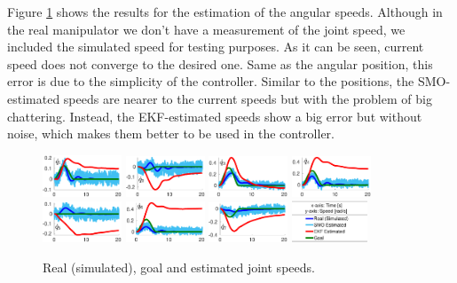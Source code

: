 \documentclass[conference,letterpaper]{ieeeconf}
\begin{document}
Figure \ref{fig:result_qp} shows the results for the estimation of the angular speeds. Although in the real manipulator we don't have a measurement of the joint speed, we included the simulated speed for testing purposes. As it can be seen, current speed does not converge to the desired one. Same as the angular position, this error is due to the simplicity of the controller. Similar to the positions, the SMO-estimated speeds are nearer to the current speeds but with the problem of big chattering. Instead, the EKF-estimated speeds show a big error but without noise, which makes them better to be used in the controller. 
\begin{figure}
  \centering
  \includegraphics[width=0.21\textwidth]{Figures/result_qp1.eps}
  \includegraphics[width=0.21\textwidth]{Figures/result_qp2.eps}
  \includegraphics[width=0.21\textwidth]{Figures/result_qp3.eps}
  \includegraphics[width=0.21\textwidth]{Figures/result_qp4.eps}
  \includegraphics[width=0.21\textwidth]{Figures/result_qp5.eps}
  \includegraphics[width=0.21\textwidth]{Figures/result_qp6.eps}
  \includegraphics[width=0.21\textwidth]{Figures/result_qp7.eps}
  \includegraphics[width=0.2\textwidth]{Figures/result_qp_legend.eps}
  \caption{Real (simulated), goal and estimated joint speeds.}
  \label{fig:result_qp}
\end{figure}
\end{document}
